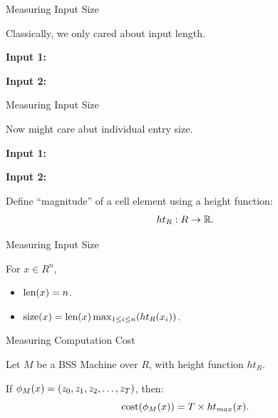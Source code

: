 \documentclass[c]{beamer}
\begin{document}
\begin{frame}{Measuring Input Size}

  Classically, we only cared about input length.

  \begin{center}
    \textbf{Input 1:}
  \end{center}

  \begin{center}
    \textbf{Input 2:}
  \end{center}

\end{frame}

\begin{frame}{Measuring Input Size}

  Now might care abut individual entry size.

  \begin{center}
    \textbf{Input 1:}
  \end{center}

  \begin{center}
    \textbf{Input 2:}
  \end{center}\pause

  Define ``magnitude'' of a cell element using a height function:
  $$ht_R:R \rightarrow \mathbb{R}.$$
\end{frame}

\begin{frame}{Measuring Input Size}
  
  For $x \in R^n$,
  \begin{itemize}
  \item[] $\text{len}(x) = n$.
  \item[] $\text{size}(x) = \text{len}(x)\max_{1 \leq i \leq n}(ht_R(x_i))$.
  \end{itemize}
  
\end{frame}

\begin{frame}{Measuring Computation Cost}
  
  Let $M$ be a BSS Machine over $R$, with height function $ht_R$.
  
  \vspace{\baselineskip}

  If $\phi_M(x) = (z_0, z_1, z_2, \ldots, z_T)$, then:
  $$\text{cost}(\phi_M(x)) = T\times ht_{max}(x).$$
  
\end{frame}
\end{document}
